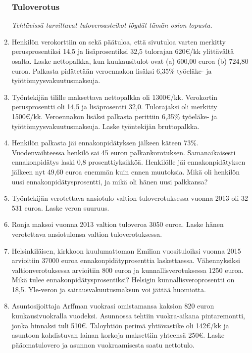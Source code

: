 \documentclass[a4paper,10pt]{article}
\begin{document}
\begin{enumerate}
\subsubsection*{Tuloverotus}
\emph{Tehtävissä tarvittavat tuloveroasteikot löydät tämän osion lopusta.}

\item Henkilön verokorttiin on sekä päätuloa, että sivutuloa varten merkitty perusprosentiksi 14,5 ja lisäprosentiksi 32,5 tulorajan 620\euro/kk ylittävältä osalta. Laske nettopalkka, kun kuukausitulot ovat (a) 600,00 euroa (b) 724,80 euroa. Palkasta pidätetään veroennakon lisäksi 6,35\% työeläke- ja työttömyysvakuutusmaksuja.

\item Työntekijän tilille maksettava nettopalkka oli 1300\euro/kk. Verokortin perusprosentti oli 14,5 ja lisäprosentti 32,0. Tulorajaksi oli merkitty 1500\euro/kk. Veroennakon lisäksi palkasta perittiin 6,35\% työeläke- ja työttömyysvakuutusmaksuja. Laske työntekijän bruttopalkka.

\item Henkilön palkasta jäi ennakonpidätyksen jälkeen käteen 73\%. Vuodenvaihteessa henkilö sai 45 euron palkankorotuksen. Samanaikaisesti ennakonpidätys laski 0,8 prosenttiyksikköä. Henkilölle jäi ennakonpidätyksen jälkeen nyt 49,60 euroa enemmän kuin ennen muutoksia. Mikä oli henkilön uusi ennakonpidätysprosentti, ja mikä oli hänen uusi palkkansa?

\item Työntekijän verotettava ansiotulo valtion tuloverotuksessa vuonna 2013 oli 32 531 euroa. Laske veron suuruus.

\item Ronja maksoi vuonna 2013 valtion tuloveroa 3050 euroa. Laske hänen verotettava ansiotulonsa valtion tuloverotuksessa.

\item Helsinkiläisen, kirkkoon kuulumattoman Emilian vuosituloiksi vuonna 2015 arvioitiin \(37 000\) euroa ennakonpidätyprosenttia laskettaessa. Vähennyksiksi valtionverotuksessa arvioitiin 800 euroa ja kunnallisverotuksessa 1250 euroa. Mikä tulee ennakonpidätysprosentiksi? Helsigin kunnallisveroprosentti on 18,5. Yle-veron ja sairausvakuutusmaksun voi jättää huomiotta.

\item Asuntosijoittaja Arffman vuokrasi omistamansa kaksion 820 euron kuukausivuokralla vuodeksi. Asunnossa tehtiin vuokra-aikana pintaremontti, jonka hinnaksi tuli 510\euro. Taloyhtiön perimä yhtiövastike oli 142\euro/kk ja asuntoon kohdistuvan lainan korkoja maksettiin yhteensä 250\euro. Laske pääomatulovero ja asunnon vuokraamisesta saatu nettotulo.


\end{enumerate}
\end{document}

